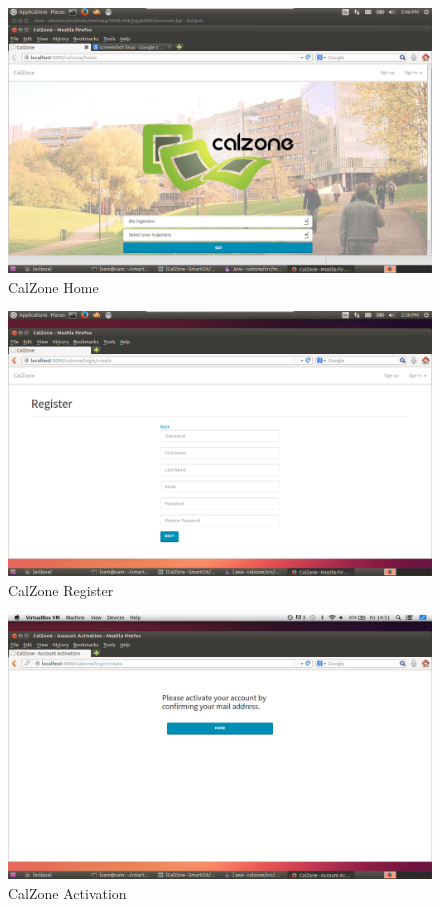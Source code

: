\begin{center}
\begin{figure}[H]
\caption{CalZone Home}
\centerline{\includegraphics[scale=0.4]{img/CalzoneHome}}
\label{fig:CalZone Home}
\end{figure}

\begin{figure}[H]
\caption{CalZone Register}
\centerline{\includegraphics[scale=0.4]{img/CalzoneRegister}}
\label{fig:CalZone Register}
\end{figure}

\begin{figure}[H]
\caption{CalZone Activation}
\centerline{\includegraphics[scale=0.4]{img/CalzoneActivation}}
\label{fig:CalZone Activation}
\end{figure}
\end{center}


